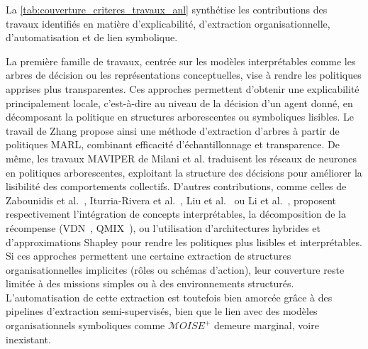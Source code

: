 La \autoref{tab:couverture_criteres_travaux_anl} synthétise les contributions des travaux identifiés en matière d'explicabilité, d'extraction organisationnelle, d'automatisation et de lien symbolique.

La première famille de travaux, centrée sur les modèles interprétables comme les arbres de décision ou les représentations conceptuelles, vise à rendre les politiques apprises plus transparentes. Ces approches permettent d’obtenir une explicabilité principalement locale, c’est-à-dire au niveau de la décision d’un agent donné, en décomposant la politique en structures arborescentes ou symboliques lisibles. Le travail de Zhang \cite{zhang2024advancing} propose ainsi une méthode d'extraction d’arbres à partir de politiques MARL, combinant efficacité d’échantillonnage et transparence. De même, les travaux MAVIPER de Milani et al. \cite{milani2022maviper,milani2024interpretable} traduisent les réseaux de neurones en politiques arborescentes, exploitant la structure des décisions pour améliorer la lisibilité des comportements collectifs. D'autres contributions, comme celles de Zabounidis et al.~\cite{zabounidis2023concept}, Iturria-Rivera et al.~\cite{iturria2024explainable}, Liu et al.~\cite{liu2025} ou Li et al.~\cite{li2025from}, proposent respectivement l'intégration de concepts interprétables, la décomposition de la récompense (VDN~\cite{Sunehag2018}, QMIX~\cite{Tabish2018}), ou l'utilisation d'architectures hybrides et d'approximations Shapley pour rendre les politiques plus lisibles et interprétables. Si ces approches permettent une certaine extraction de structures organisationnelles implicites (rôles ou schémas d’action), leur couverture reste limitée à des missions simples ou à des environnements structurés. L’automatisation de cette extraction est toutefois bien amorcée grâce à des pipelines d’extraction semi-supervisés, bien que le lien avec des modèles organisationnels symboliques comme $\mathcal{M}OISE^+$ demeure marginal, voire inexistant.

